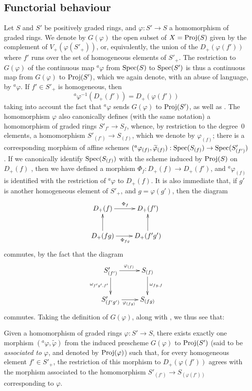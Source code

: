 \subsection{Functorial behaviour}
\label{subsection:II.2.8}

\begin{env}[2.8.1]
\label{II.2.8.1}
Let $S$ and $S'$ be positively graded rings, and $\varphi:S'\to S$ a homomorphism of graded rings.
We denote by $G(\varphi)$ the open subset of $X=\operatorname{Proj}(S)$ given by the complement of $V_+(\varphi(S'_+))$, or, equivalently, the union of the $D_+(\varphi(f'))$ where $f'$ runs over the set of homogeneous elements of $S'_+$.
The restriction to $G(\varphi)$ of the continuous map ${}^a\varphi$ from $\operatorname{Spec}(S)$ to $\operatorname{Spec}(S')$  is thus a continuous map from $G(\varphi)$ to $\operatorname{Proj}(S')$, which we again denote, with an abuse of language, by ${}^a\varphi$.
If $f'\in S'_+$ is homogeneous, then
\[
\label{II.2.8.1.1}
  {}^a\varphi^{-1}(D_+(f')) = D_+(\varphi(f'))
\tag{2.8.1.1}
\]
taking into account the fact that ${}^a\varphi$ sends $G(\varphi)$ to $\operatorname{Proj}(S')$, as well as .
The homomorphism $\varphi$ also canonically defines (with the same notation) a homomorphism of graded rings $S'_{f'}\to S_f$, whence, by restriction to the degree~$0$ elements,
a homomorphism $S'_{(f')}\to S_{(f)}$, which we denote by $\varphi_{(f)}$;
there is a corresponding  morphism of affine schemes $({}^a\varphi_{(f)},\widetilde{\varphi}_{(f)}):\Spec(S_{(f)})\to\Spec(S'_{(f')})$.
If we canonically identify $\operatorname{Spec}(S_{(f)})$ with the scheme induced by $\operatorname{Proj}(S)$ on $D_+(f)$ , then we have defined a morphism $\Phi_f:D_+(f)\to D_+(f')$, and ${}^a\varphi_{(f)}$ is identified with the restriction of ${}^a\varphi$ to $D_+(f)$.
It is also immediate that, if $g'$ is another homogeneous element of $S'_+$, and $g=\varphi(g')$, then the diagram
\[
  \xymatrix{
    D_+(f) \ar[r]^{\Phi_f}
    & D_+(f')
  \\D_+(fg) \ar[u] \ar[r]_{\Phi_{fg}}
    & D_+(f'g') \ar[u]
  }
\]
commutes, by the fact that the diagram
\[
  \xymatrix{
    S'_{(f')} \ar[r]^{\varphi_{(f)}} \ar[d]_{\omega_{f'g',f'}}
    & S_{(f)} \ar[d]^{\omega_{fg,f}}
  \\S'_{(f'g')} \ar[r]_{\varphi_{(fg)}}
    & S_{(fg)}
  }
\]
commutes.
Taking the definition of $G(\varphi)$, along with , we thus see that:
\end{env}

\begin{proposition}[2.8.2]
\label{II.2.8.2}
Given a homomorphism of graded rings $\varphi: S'\to S$, there exists exactly one morphism $({}^a\varphi,\widetilde{\varphi})$ from the induced prescheme $G(\varphi)$ to $\operatorname{Proj}(S')$ (said to be \emph{associated to $\varphi$}, and denoted by $\operatorname{Proj}(\varphi)$) such that, for every homogeneous element $f'\in S'_+$, the restriction of this morphism to $D_+(\varphi(f'))$ agrees with the morphism associated to the homomorphism $S'_{(f')}\to S_{(\varphi(f'))}$ corresponding to $\varphi$.
\end{proposition}

